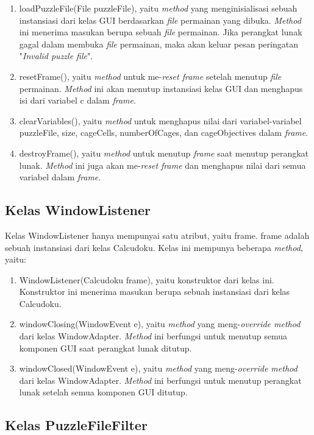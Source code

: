 \begin{enumerate}
\item loadPuzzleFile(File puzzleFile), yaitu \textit{method} yang menginisialisasi sebuah instansiasi dari kelas GUI berdasarkan \textit{file} permainan yang dibuka. \textit{Method} ini menerima masukan berupa sebuah \textit{file} permainan. Jika perangkat lunak gagal dalam membuka \textit{file} permainan, maka akan keluar pesan peringatan "\textit{Invalid puzzle file}".
\item resetFrame(), yaitu \textit{method} untuk me-\textit{reset frame} setelah menutup \textit{file} permainan. \textit{Method} ini akan menutup instansiasi kelas GUI dan menghapus isi dari variabel c dalam \textit{frame}.
\item clearVariables(), yaitu \textit{method} untuk menghapus nilai dari variabel-variabel puzzleFile, size, cageCells, numberOfCages, dan cageObjectives dalam \textit{frame}.
\item destroyFrame(), yaitu \textit{method} untuk menutup \textit{frame} saat menutup perangkat lunak. \textit{Method} ini juga akan me-\textit{reset frame} dan menghapus nilai dari semua variabel dalam \textit{frame}.
\end{enumerate}

\subsection{Kelas WindowListener}
\label{sec:kelaswindowlistener}

Kelas WindowListener hanya mempunyai satu atribut, yaitu frame. frame adalah sebuah instansiasi dari kelas Calcudoku. Kelas ini mempunya beberapa \textit{method}, yaitu:

\begin{enumerate}
\item WindowListener(Calcudoku frame), yaitu konstruktor dari kelas ini. Konstruktor ini menerima masukan berupa sebuah instansiasi dari kelas Calcudoku.
\item windowClosing(WindowEvent e), yaitu \textit{method} yang meng-\textit{override method} dari kelas WindowAdapter. \textit{Method} ini berfungsi untuk menutup semua komponen GUI saat perangkat lunak ditutup.
\item windowClosed(WindowEvent e), yaitu \textit{method} yang meng-\textit{override method} dari kelas WindowAdapter. \textit{Method} ini berfungsi untuk menutup perangkat lunak setelah semua komponen GUI ditutup.
\end{enumerate}

\subsection{Kelas PuzzleFileFilter}
\label{sec:kelaspuzzlefilefilter}

